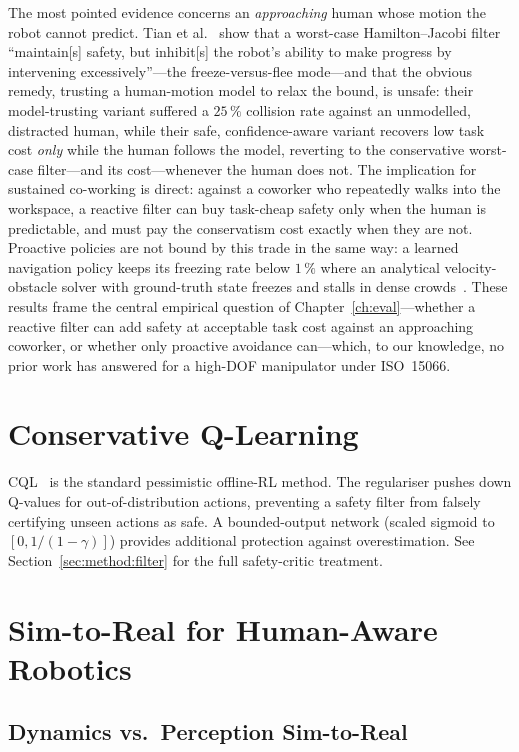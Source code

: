 \documentclass[11pt,a4paper]{report}
\newcommand{\iso}{ISO~15066}
\begin{document}
The most pointed evidence concerns an \emph{approaching} human whose
motion the robot cannot predict. Tian et al.~\cite{tian2022confidence}
show that a worst-case Hamilton--Jacobi filter ``maintain[s] safety, but
inhibit[s] the robot's ability to make progress by intervening
excessively''---the freeze-versus-flee mode---and that the obvious
remedy, trusting a human-motion model to relax the bound, is unsafe:
their model-trusting variant suffered a $25\,\%$ collision rate against
an unmodelled, distracted human, while their safe, confidence-aware
variant recovers low task cost \emph{only} while the human follows the
model, reverting to the conservative worst-case filter---and its
cost---whenever the human does not. The implication for sustained
co-working is direct: against a coworker who repeatedly walks into the
workspace, a reactive filter can buy task-cheap safety only when the
human is predictable, and must pay the conservatism cost exactly when
they are not. Proactive policies are not bound by this trade in the same
way: a learned navigation policy keeps its freezing rate below
$1\,\%$ where an analytical velocity-obstacle solver with ground-truth
state freezes and stalls in dense crowds~\cite{dontfreeze2026}. These
results frame the central empirical question of
Chapter~\ref{ch:eval}---whether a reactive filter can add safety at
acceptable task cost against an approaching coworker, or whether only
proactive avoidance can---which, to our knowledge, no prior work has
answered for a high-DOF manipulator under \iso{}.

\section{Conservative Q-Learning}
\label{sec:bg:cql}

\textsc{CQL}~\cite{kumar2020cql} is the standard pessimistic
offline-RL method. The regulariser pushes down Q-values for
out-of-distribution actions, preventing a safety filter from
falsely certifying unseen actions as safe. A bounded-output network
(scaled sigmoid to $[0, 1/(1-\gamma)]$) provides additional
protection against overestimation. See
Section~\ref{sec:method:filter} for the full safety-critic
treatment.

\section{Sim-to-Real for Human-Aware Robotics}
\label{sec:bg:sim2real}

\subsection{Dynamics vs.\ Perception Sim-to-Real}
\label{sec:bg:sim2real:dyn-perc}
\end{document}
